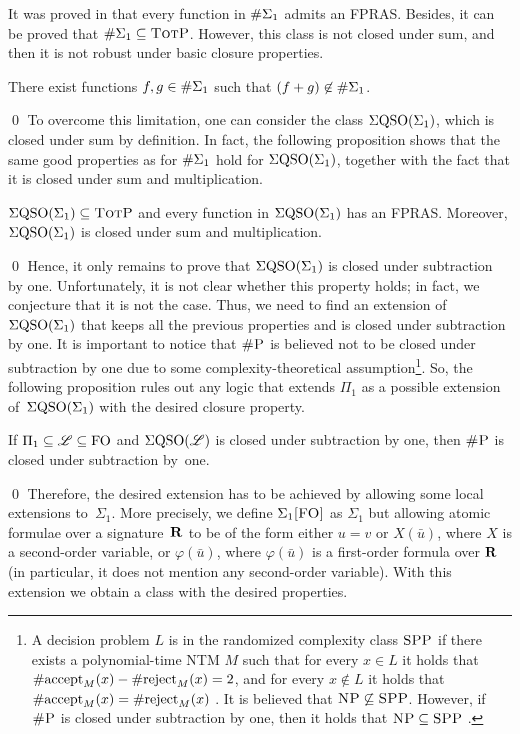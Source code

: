 It was proved in \cite{SalujaST95} that every function in $\#\Sigma_{1}$ admits an FPRAS. Besides, it can be proved that $\#\Sigma_{1} \subseteq \text{\sc TotP}$. 
However, this class is not closed under sum, and then it is not robust under basic closure properties. 
\begin{prop}\label{prop-e1-nc}
There exist functions $f, g \in \#\Sigma_{1}$ such that $(f + g) \not\in \#\Sigma_{1}$.
\end{prop}
\proof

\qed
To overcome this limitation, one can consider the class $\Sigma{\rm QSO}(\Sigma_{1})$, which is closed under sum by definition. In fact, the following proposition shows that the same good properties as for $\#\Sigma_{1}$ hold for $\Sigma{\rm QSO}(\Sigma_{1})$, together with the fact that it is closed under sum and multiplication.
\begin{prop} \label{prop:qe0-fp-qe1-totp-fptras}
$\Sigma{\rm QSO}(\Sigma_{1}) \subseteq \text{\sc TotP}$ and every function in $\Sigma{\rm QSO}(\Sigma_{1})$ has an FPRAS. Moreover, $\Sigma{\rm QSO}(\Sigma_{1})$ is closed under sum and multiplication.
\end{prop}
\proof

\qed
Hence, it only remains to prove that $\Sigma{\rm QSO}(\Sigma_{1})$ is closed under subtraction by one. Unfortunately, it is not clear whether this property holds; in fact, we conjecture that it is not the case. Thus, we need to find an extension of $\Sigma{\rm QSO}(\Sigma_{1})$ that keeps all the previous properties and is closed under subtraction by one. It is important to notice that $\text{\sc \#P}$ is believed not to be closed under subtraction by one due to some complexity-theoretical assumption\footnote{A decision problem $L$ is in the randomized complexity class $\text{\sc SPP}$ if there exists a polynomial-time NTM $M$ such that for every $x \in L$ it holds that $\text{\rm \#accept}_M(x) - \text{\rm \#reject}_M(x) = 2$, and for every $x \not\in L$ it holds that $\text{\rm \#accept}_M(x) = \text{\rm \#reject}_M(x)$ \cite{OH93,FFK94}. It is believed that $\text{\sc NP} \not\subseteq \text{\sc SPP}$.
However, if $\text{\sc \#P}$ is closed under subtraction by one, then it holds that $\text{\sc NP} \subseteq \text{\sc SPP}$ \cite{OH93}.}. So, the following proposition rules out any logic that extends $\Pi_1$ as a possible extension of~$\Sigma{\rm QSO}(\Sigma_{1})$ with the desired closure property.
\begin{prop} \label{pi-minusone}
If $\Pi_1 \subseteq \mathscr{L} \subseteq {\rm FO}$ and $\Sigma{\rm QSO}(\mathscr{L})$ is closed under subtraction by one, then $\text{\sc \#P}$ is closed under subtraction by~one. 
\end{prop}
\proof

\qed
Therefore, the desired extension has to be achieved by allowing some local extensions to~$\Sigma_1$. More precisely, we define $\Sigma_{1}\textsc{[FO]}$ as $\Sigma_1$ but allowing atomic formulae over a signature~$\mathbf{R}$ to be of the form either $u = v$ or $X(\bar u)$, where $X$ is a second-order variable, or $\varphi(\bar u)$, where $\varphi(\bar u)$ is a first-order formula over $\mathbf{R}$ (in particular, it does not mention any second-order variable). With this extension we obtain a class with the desired properties.
